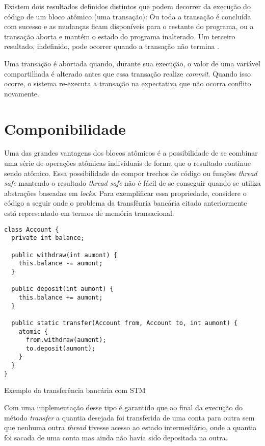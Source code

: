 Existem dois resultados definidos distintos que podem decorrer da execução do código de um bloco atômico (uma transação): Ou toda a transação é concluída com sucesso e as mudanças ficam disponíveis para o restante do programa, ou a transação aborta e mantém o estado do programa inalterado. Um terceiro resultado, indefinido, pode ocorrer quando a transação não termina \cite{helinefficiency}.

Uma transação é abortada quando, durante sua execução, o valor de uma variável compartilhada é alterado antes que essa transação realize \emph{commit}. Quando isso ocorre, o sistema re-executa a transação na expectativa que não ocorra conflito novamente.


\section{Componibilidade}

Uma das grandes vantagens dos blocos atômicos é a possibilidade de se combinar uma série de operações atômicas individuais de forma que o resultado continue sendo atômico. Essa possibilidade de compor trechos de código ou funções \emph{thread safe} mantendo o resultado \emph{thread safe} não é fácil de se conseguir quando se utiliza abstrações baseadas em \emph{locks}. Para exemplificar essa propriedade, considere o código a seguir onde o problema da transfênria bancária citado anteriormente está representado em termos de memória transacional:

\begin{listing}
  \begin{verbatim}
class Account {
  private int balance;
  
  public withdraw(int aumont) {
    this.balance -= aumont;
  }

  public deposit(int aumont) {
    this.balance += aumont;
  }

  public static transfer(Account from, Account to, int aumont) {
    atomic {
      from.withdraw(aumont);
      to.deposit(aumont);
    }
  }
}
  \end{verbatim}
  \caption{Exemplo da transferência bancária com STM}
\end{listing}

Com uma implementação desse tipo é garantido que ao final da execução do método \emph{transfer} a quantia desejada foi transferida de uma conta para outra sem que nenhuma outra \emph{thread} tivesse acesso ao estado intermediário, onde a quantia foi sacada de uma conta mas ainda não havia sido depositada na outra.


